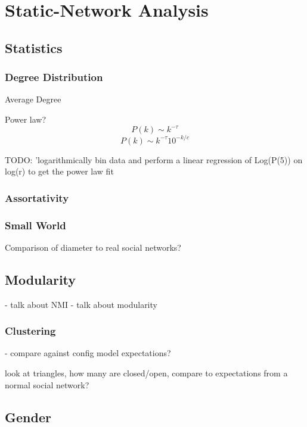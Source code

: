 \section{Static-Network Analysis}

\subsection{Statistics}

\subsubsection{Degree Distribution}
Average Degree

Power law? 
$$P(k) \sim k^{-\tau}$$
$$P(k) \sim k^{-\tau}10^{-k/c}$$

TODO: 'logarithmically bin data and perform a linear regression of Log(P(5)) on log(r) to get the power law fit

\subsubsection{Assortativity}

\subsubsection{Small World}
Comparison of diameter to real social networks?

\subsection{Modularity}

- talk about NMI
- talk about modularity

\subsubsection{Clustering}
 - compare against config model expectations?

 look at triangles, how many are closed/open, compare to expectations from a normal social network?

\subsection{Gender}

